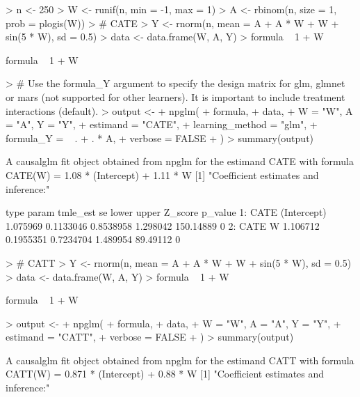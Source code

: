 \documentclass{article}
\begin{document}
\begin{Schunk}
\begin{Sinput}
> n <- 250
> W <- runif(n, min = -1, max = 1)
> A <- rbinom(n, size = 1, prob = plogis(W))
> # CATE
> Y <- rnorm(n, mean = A + A * W + W + sin(5 * W), sd = 0.5)
> data <- data.frame(W, A, Y)
> formula ~ 1 + W
\end{Sinput}
\begin{Soutput}
formula ~ 1 + W
\end{Soutput}
\begin{Sinput}
> # Use the formula_Y argument to specify the design matrix for glm, glmnet or mars (not supported for other learners). It is important to include treatment interactions (default).
> output <-
+   npglm(
+     formula,
+     data,
+     W = "W", A = "A", Y = "Y",
+     estimand = "CATE",
+     learning_method = "glm",
+     formula_Y = ~ . + . * A,
+     verbose = FALSE
+   )
> summary(output)
\end{Sinput}
\begin{Soutput}
A causalglm fit object obtained from npglm for the estimand CATE with formula 
CATE(W) = 1.08 * (Intercept) + 1.11 * W
[1] "Coefficient estimates and inference:"

   type       param tmle_est        se     lower    upper   Z_score p_value
1: CATE (Intercept) 1.075969 0.1133046 0.8538958 1.298042 150.14889       0
2: CATE           W 1.106712 0.1955351 0.7234704 1.489954  89.49112       0
\end{Soutput}
\begin{Sinput}
> # CATT
> Y <- rnorm(n, mean = A + A * W + W + sin(5 * W), sd = 0.5)
> data <- data.frame(W, A, Y)
> formula ~ 1 + W
\end{Sinput}
\begin{Soutput}
formula ~ 1 + W
\end{Soutput}
\begin{Sinput}
> output <-
+   npglm(
+     formula,
+     data,
+     W = "W", A = "A", Y = "Y",
+     estimand = "CATT",
+     verbose = FALSE
+   )
> summary(output)
\end{Sinput}
\begin{Soutput}
A causalglm fit object obtained from npglm for the estimand CATT with formula 
CATT(W) = 0.871 * (Intercept) + 0.88 * W
[1] "Coefficient estimates and inference:"


\end{Soutput}
\end{Schunk}
\end{document}
